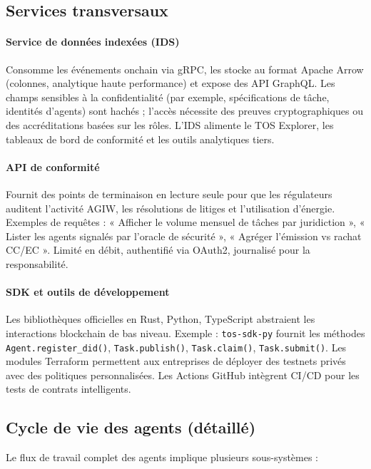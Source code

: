 \documentclass[11pt]{article}
\begin{document}
\subsection{Services transversaux}
\paragraph{Service de données indexées (IDS)} Consomme les événements onchain via gRPC, les stocke au format Apache Arrow (colonnes, analytique haute performance) et expose des API GraphQL. Les champs sensibles à la confidentialité (par exemple, spécifications de tâche, identités d'agents) sont hachés ; l'accès nécessite des preuves cryptographiques ou des accréditations basées sur les rôles. L'IDS alimente le TOS Explorer, les tableaux de bord de conformité et les outils analytiques tiers.

\paragraph{API de conformité} Fournit des points de terminaison en lecture seule pour que les régulateurs auditent l'activité AGIW, les résolutions de litiges et l'utilisation d'énergie. Exemples de requêtes : « Afficher le volume mensuel de tâches par juridiction », « Lister les agents signalés par l'oracle de sécurité », « Agréger l'émission vs rachat CC/EC ». Limité en débit, authentifié via OAuth2, journalisé pour la responsabilité.

\paragraph{SDK et outils de développement} Les bibliothèques officielles en Rust, Python, TypeScript abstraient les interactions blockchain de bas niveau. Exemple : \texttt{tos-sdk-py} fournit les méthodes \texttt{Agent.register\_did()}, \texttt{Task.publish()}, \texttt{Task.claim()}, \texttt{Task.submit()}. Les modules Terraform permettent aux entreprises de déployer des testnets privés avec des politiques personnalisées. Les Actions GitHub intègrent CI/CD pour les tests de contrats intelligents.

\subsection{Cycle de vie des agents (détaillé)}
Le flux de travail complet des agents implique plusieurs sous-systèmes :
\end{document}
